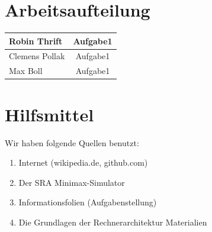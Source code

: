 \documentclass[12pt,titlepage]{article}
\begin{document}
\section{Arbeitsaufteilung}

\begin{tabular} { |l||c| }
\hline
Robin Thrift & Aufgabe1 \\
\hline
Clemens Pollak & Aufgabe1 \\
\hline
Max Boll & Aufgabe1 \\
\hline
\end{tabular}

\section{Hilfsmittel}
Wir haben folgende Quellen benutzt:
\begin{enumerate} 
\item Internet (wikipedia.de, github.com)
\item Der SRA Minimax-Simulator
\item Informationsfolien (Aufgabenstellung)
\item Die Grundlagen der Rechnerarchitektur Materialien
\end{enumerate}
\end{document}
